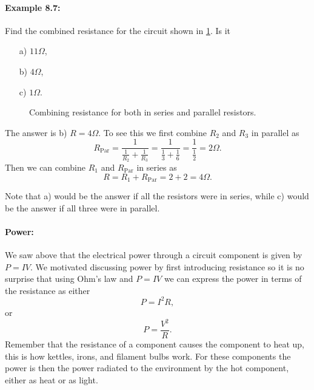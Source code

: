 \documentclass[a4paper,12pt]{book}
\begin{document}
\paragraph{Example 8.7:} Find the combined resistance for the circuit shown in \cref{fig: combining resistance example}. Is it
\begin{itemize}
\setlength{\itemsep}{-5pt}
    \item[a)] $11\Omega$,
    \item[b)] $4\Omega$,
    \item[c)] $1\Omega$.
\end{itemize}

  \begin{figure}[ht]
    \centering
    \caption{Combining resistance for both in series and parallel resistors.}
    \label{fig: combining resistance example}
\end{figure}

The answer is b) $R=4\Omega$. To see this we first combine $R_{2}$ and $R_{3}$ in parallel as
\begin{equation*}
R_{\text{Par}}=\frac{1}{\frac{1}{R_{2}}+\frac{1}{R_{3}}}=\frac{1}{\frac{1}{3}+\frac{1}{6}}=\frac{1}{\frac{1}{2}}=2\Omega.
\end{equation*}
Then we can combine $R_{1}$ and $R_{\text{Par}}$ in series as
\begin{equation*}
R =R_{1}+R_{\text{Par}}=2+2=4\Omega.
\end{equation*}

Note that a) would be the answer if all the resistors were in series, while c) would be the answer if all three were in parallel.

\paragraph{Power:} We saw above that the electrical power through a circuit component is given by $P=IV$. We motivated discussing power by first introducing resistance so it is no surprise that using Ohm's law and $P=IV$ we can express the power in terms of the resistance as either
\begin{equation*}
P=I^{2}R,
\end{equation*}
or
\begin{equation*}
P=\frac{V^{2}}{R}.
\end{equation*}
Remember that the resistance of a component causes the component to heat up, this is how kettles, irons, and filament bulbs work. For these components the power is then the power radiated to the environment by the hot component, either as heat or as light.
\end{document}
